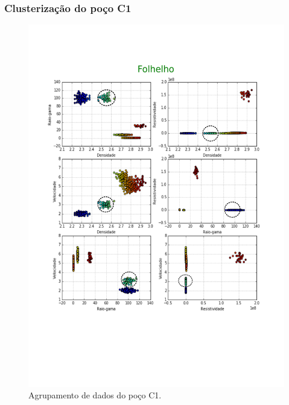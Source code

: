 \documentclass[aspectratio=10]{beamer} %
\begin{document}
\begin{frame}
\frametitle{Clusterização do poço C1}
\begin{figure}[H]
\centering
\includegraphics[scale=0.3]{Imagens/folhelhoC1.png}
\caption{Agrupamento de dados do poço C1.}
\end{figure} 
\end{frame}
\end{document}
